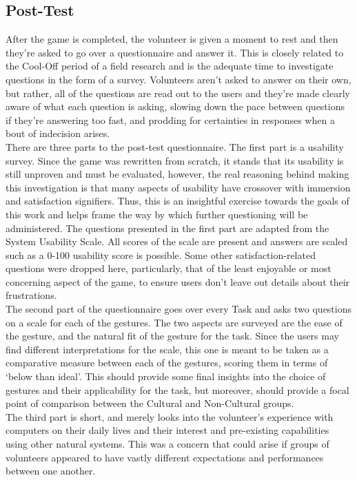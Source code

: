     \subsection{Post-Test} \label{sec:develop_trials_post}
    After the game is completed, the volunteer is given a moment to rest and then they’re asked to go over a questionnaire and answer it. This is closely related to the Cool-Off period of a field research and is the adequate time to investigate questions in the form of a survey. Volunteers aren’t asked to answer on their own, but rather, all of the questions are read out to the users and they’re made clearly aware of what each question is asking, slowing down the pace between questions if they’re answering too fast, and prodding for certainties in responses when a bout of indecision arises.\\
    There are three parts to the post-test questionnaire. The first part is a usability survey. Since the game was rewritten from scratch, it stands that its usability is still unproven and must be evaluated, however, the real reasoning behind making this investigation is that many aspects of usability have crossover with immersion and satisfaction signifiers. Thus, this is an insightful exercise towards the goals of this work and helps frame the way by which further questioning will be administered. The questions presented in the first part are adapted from the System Usability Scale. All scores of the scale are present and answers are scaled such as a 0-100 usability score is possible. Some other satisfaction-related questions were dropped here, particularly, that of the least enjoyable or most concerning aspect of the game, to ensure users don’t leave out details about their frustrations.\\ 
    The second part of the questionnaire goes over every Task and asks two questions on a scale for each of the gestures. The two aspects are surveyed are the ease of the gesture, and the natural fit of the gesture for the task. Since the users may find different interpretations for the scale, this one is meant to be taken as a comparative measure between each of the gestures, scoring them in terms of ‘below than ideal’. This should provide some final insights into the choice of gestures and their applicability for the task, but moreover, should provide a focal point of comparison between the Cultural and Non-Cultural groups.\\
    The third part is short, and merely looks into the volunteer’s experience with computers on their daily lives and their interest and pre-existing capabilities using other natural systems. This was a concern that could arise if groups of volunteers appeared to have vastly different expectations and performances between one another.\\
    
